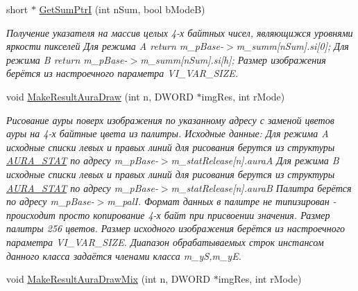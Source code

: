 \begin{DoxyCompactItemize}
short $\ast$ \hyperlink{class_c_v_i_engine_thread_ac9185cf585d0d141ccd42b7891020776}{Get\+Sum\+Ptr\+I} (int n\+Sum, bool b\+Mode\+B)
\begin{DoxyCompactList}\small\item\em Получение указателя на массив целых 4-\/х байтных чисел, являющижся уровнями яркости пикселей Для режима A return m\+\_\+p\+Base-\/$>$m\+\_\+summ\mbox{[}n\+Sum\mbox{]}.si\mbox{[}0\mbox{]}; Для режима B return m\+\_\+p\+Base-\/$>$m\+\_\+summ\mbox{[}n\+Sum\mbox{]}.si\mbox{[}h\mbox{]}; Размер изображения берётся из настроечного параметра V\+I\+\_\+\+V\+A\+R\+\_\+\+S\+I\+Z\+E. \end{DoxyCompactList}\item 
void \hyperlink{class_c_v_i_engine_thread_ae6cccc248ff3e63ee357ec6453f2ce4b}{Make\+Result\+Aura\+Draw} (int n, D\+W\+O\+R\+D $\ast$img\+Res, int r\+Mode)
\begin{DoxyCompactList}\small\item\em Рисование ауры поверх изображения по указанному адресу с заменой цветов ауры на 4-\/х байтные цвета из палитры. Исходные данные\+: Для режима A исходные списки левых и правых линий для рисования берутся из структуры \hyperlink{class_a_u_r_a___s_t_a_t}{A\+U\+R\+A\+\_\+\+S\+T\+A\+T} по адресу m\+\_\+p\+Base-\/$>$m\+\_\+stat\+Release\mbox{[}n\mbox{]}.aura\+A Для режима B исходные списки левых и правых линий для рисования берутся из структуры \hyperlink{class_a_u_r_a___s_t_a_t}{A\+U\+R\+A\+\_\+\+S\+T\+A\+T} по адресу m\+\_\+p\+Base-\/$>$m\+\_\+stat\+Release\mbox{[}n\mbox{]}.aura\+B Палитра берётся по адресу m\+\_\+p\+Base-\/$>$m\+\_\+pal\+I. Формат данных в палитре не типизирован -\/ происходит просто копирование 4-\/х байт при присвоении значения. Размер палитры 256 цветов. Размер исходного изображения берётся из настроечного параметра V\+I\+\_\+\+V\+A\+R\+\_\+\+S\+I\+Z\+E. Диапазон обрабатываемых строк инстансом данного класса задаётся членами класса m\+\_\+y\+S,m\+\_\+y\+E. \end{DoxyCompactList}\item 
void \hyperlink{class_c_v_i_engine_thread_a61e44ad37880d66e07855e751b67d9d3}{Make\+Result\+Aura\+Draw\+Mix} (int n, D\+W\+O\+R\+D $\ast$img\+Res, int r\+Mode)

\end{DoxyCompactItemize}
